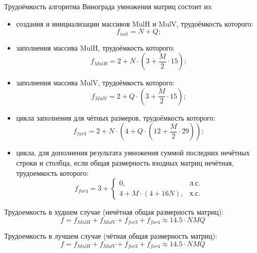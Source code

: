 Трудоёмкость алгоритма Винограда умножения матриц состоит из:
\begin{itemize}
	\item создания и инициализации массивов MulH и MulV, трудоёмкость которого:
	\begin{equation}
		\label{for:init}
		f_{init} = N + Q;
	\end{equation}
	
	\item заполнения массива MulH, трудоёмкость которого:
	\begin{equation}
		\label{for:MulH}
		f_{MulH} = 2 + N \cdot (3 + \frac{M}{2} \cdot 15);
	\end{equation}
	
	\item заполнения массива MulV, трудоёмкость которого:
	\begin{equation}
		\label{for:MulV}
		f_{MulV} = 2 + Q \cdot (3 + \frac{M}{2} \cdot 15);
	\end{equation}
	
	\item цикла заполнения для чётных размеров, трудоёмкость которого:
	\begin{equation}
		\label{for:cycle3}
		f_{for3} = 2 + N \cdot (4 + Q \cdot (12 + \frac{M}{2} \cdot 29));
	\end{equation}
	
	\item цикла, для дополнения результата умножения суммой последних нечётных строки и столбца, если общая размерность входных матриц нечётная, трудоемкость которого:
	\begin{equation}
		\label{for:cycle4}
		f_{for4} = 3 + \begin{cases}
			0, & \text{л.с.}\\
			4 + M \cdot (4 + 16N), & \text{х.с.}
		\end{cases}
	\end{equation}
\end{itemize}

Трудоемкость в худшем случае (нечётная общая размерность матриц):
\begin{equation}
	\label{for:bad}
	f =  f_{MulH} + f_{MulV} + f_{for3} + f_{for4} \approx 14.5 \cdot NMQ
\end{equation}

Трудоемкость в лучшем случае (чётная общая размерность матриц):
\begin{equation}
	\label{for:good}
f =  f_{MulH} + f_{MulV} + f_{for3} + f_{for4} \approx 14.5 \cdot NMQ
\end{equation}


